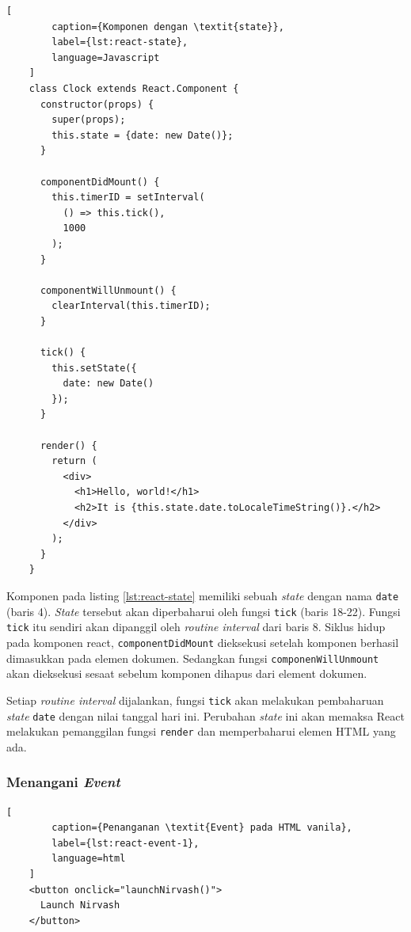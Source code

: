    \begin{lstlisting}[
        caption={Komponen dengan \textit{state}}, 
        label={lst:react-state}, 
        language=Javascript
    ]
    class Clock extends React.Component {
      constructor(props) {
        super(props);
        this.state = {date: new Date()};
      }
    
      componentDidMount() {
        this.timerID = setInterval(
          () => this.tick(),
          1000
        );
      }
    
      componentWillUnmount() {
        clearInterval(this.timerID);
      }
    
      tick() {
        this.setState({
          date: new Date()
        });
      }
    
      render() {
        return (
          <div>
            <h1>Hello, world!</h1>
            <h2>It is {this.state.date.toLocaleTimeString()}.</h2>
          </div>
        );
      }
    }
    \end{lstlisting}
    
    Komponen pada listing \ref{lst:react-state} memiliki sebuah \textit{state} dengan nama \texttt{date} (baris 4). \textit{State} tersebut akan diperbaharui oleh fungsi \texttt{tick} (baris 18-22). Fungsi \texttt{tick} itu sendiri akan dipanggil oleh \textit{routine interval} dari baris 8. Siklus hidup pada komponen react, \texttt{componentDidMount} dieksekusi setelah komponen berhasil dimasukkan pada elemen dokumen. Sedangkan fungsi \texttt{componenWillUnmount} akan dieksekusi sesaat sebelum komponen dihapus dari element dokumen.
    
    Setiap \textit{routine interval} dijalankan, fungsi \texttt{tick} akan melakukan pembaharuan \textit{state} \texttt{date} dengan nilai tanggal hari ini.
    Perubahan \textit{state} ini akan memaksa React melakukan pemanggilan fungsi \texttt{render} dan memperbaharui elemen HTML yang ada.
    
    \subsubsection{Menangani \textit{Event}}
    \begin{lstlisting}[
        caption={Penanganan \textit{Event} pada HTML vanila}, 
        label={lst:react-event-1}, 
        language=html
    ]
    <button onclick="launchNirvash()">
      Launch Nirvash
    </button>
    \end{lstlisting}
    
